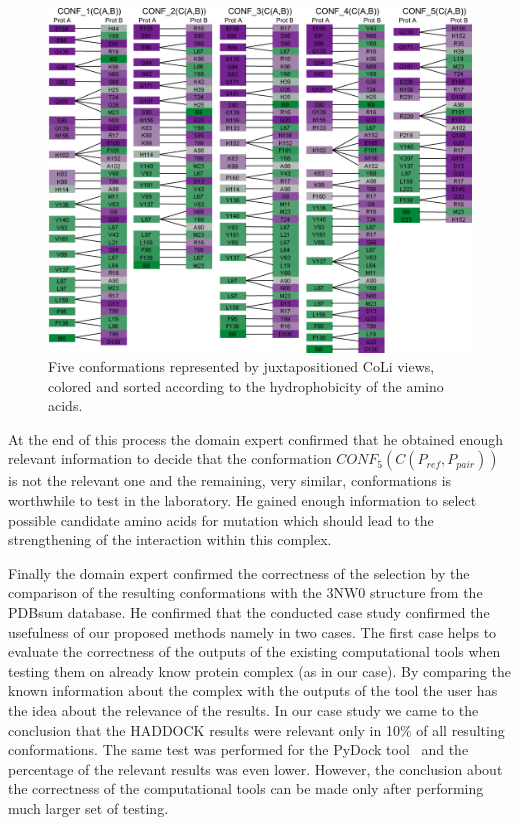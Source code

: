 \documentclass[journal]{vgtc}                %
\begin{document}
\begin{figure}[bt]
  \centering
  \includegraphics[width=0.9\linewidth]{case3.pdf}
  \caption{Five conformations represented by juxtapositioned CoLi views, colored and sorted according to the hydrophobicity of the amino acids.}
  \label{fig:case3}
\end{figure}

At the end of this process the domain expert confirmed that he obtained enough relevant information to decide that the conformation $CONF_5(C(P_{ref},P_{pair}))$ is not the relevant one and the remaining, very similar, conformations is worthwhile to test in the laboratory.
He gained enough information to select possible candidate amino acids for mutation which should lead to the strengthening of the interaction within this complex.

Finally the domain expert confirmed the correctness of the selection by the comparison of the resulting conformations with the 3NW0 structure from the PDBsum database.
He confirmed that the conducted case study confirmed the usefulness of our proposed methods namely in two cases.
The first case helps to evaluate the correctness of the outputs of the existing computational tools when testing them on already know protein complex (as in our case).
By comparing the known information about the complex with the outputs of the tool the user has the idea about the relevance of the results.
In our case study we came to the conclusion that the HADDOCK results were relevant only in 10\% of all resulting conformations.
The same test was performed for the PyDock tool~\cite{pydock} and the percentage of the relevant results was even lower.
However, the conclusion about the correctness of the computational tools can be made only after performing much larger set of testing.
\end{document}
